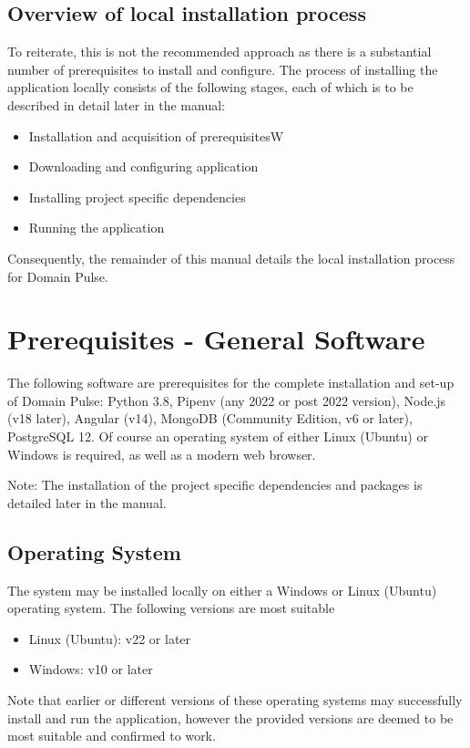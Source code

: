 \documentclass[12pt]{article}
\begin{document}
\subsection{Overview of local installation process}
To reiterate, this is not the recommended approach as there is a substantial number of prerequisites to install and configure.
The process of installing the application locally consists of the following stages, each of which is to be described in detail
later in the manual:
\begin{itemize}
    \item Installation and acquisition of prerequisitesW
    \item Downloading and configuring application
    \item Installing project specific dependencies
    \item Running the application
\end{itemize}
Consequently, the remainder of this manual details the local installation process for Domain Pulse.

\section{Prerequisites - General Software}
The following software are prerequisites for the complete installation and set-up of Domain Pulse: Python 3.8, Pipenv (any 2022 or post 2022 version), Node.js (v18 later), Angular (v14), MongoDB (Community Edition, v6 or later), PostgreSQL 12.
Of course an operating system of either Linux (Ubuntu) or Windows is required, as well as a modern web browser.

Note: The installation of the project specific dependencies and packages is detailed later in the manual.

\subsection{Operating System}
The system may be installed locally on either a Windows or Linux (Ubuntu) operating system. The following versions are most suitable
\begin{itemize}
    \item Linux (Ubuntu): v22 or later
    \item Windows: v10 or later
\end{itemize}
Note that earlier or different versions of these operating systems may successfully install and run the application, however the provided
versions are deemed to be most suitable and confirmed to work.
\end{document}
